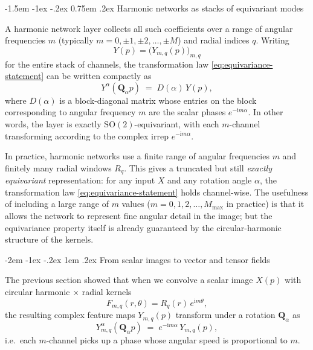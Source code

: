 \documentclass[12pt]{article}
\makeatletter
\renewcommand\section{\@startsection {section}{1}{\z@}%
                                   {-2em \@plus -1ex \@minus -.2ex}%
                                   {1em \@plus.2ex}%
                                   {\normalfont\Large\bfseries}}
\renewcommand\subsection{\@startsection{subsection}{2}{\z@}%
                                     {-1.5em \@plus -1ex \@minus -.2ex}%
                                     {0.75em \@plus .2ex}%
                                     {\normalfont\large\bfseries}}
\makeatother
\begin{document}
\subsection{Harmonic networks as stacks of equivariant modes}

A harmonic network layer collects all such coefficients over a range
of angular frequencies $m$ (typically $m=0,\pm1,\pm2,\dots,\pm M$)
and radial indices $q$. Writing
\[
  Y(p) =
  \bigl(Y_{m,q}(p)\bigr)_{m,q}
\]
for the entire stack of channels, the transformation law
\eqref{eq:equivariance-statement} can be written compactly as
\begin{equation}
  \label{eq:equivariance-matrix-form}
  Y^\alpha(\mathbf{Q}_\alpha p)
  \;=\;
  D(\alpha)\,Y(p),
\end{equation}
where $D(\alpha)$ is a block-diagonal matrix whose entries on the
block corresponding to angular frequency $m$ are the scalar phases
$e^{-\mathrm{i}m\alpha}$. In other words, the layer is exactly
$\mathrm{SO}(2)$-equivariant, with each $m$-channel transforming
according to the complex irrep $e^{-\mathrm{i}m\alpha}$.

In practice, harmonic networks use a finite range of angular
frequencies $m$ and finitely many radial windows $R_q$. This gives a
truncated but still \emph{exactly equivariant} representation: for
any input $X$ and any rotation angle $\alpha$, the transformation law
\eqref{eq:equivariance-statement} holds channel-wise. The usefulness
of including a large range of $m$ values
($m = 0,1,2,\dots,M_{\max}$ in practice) is that it allows the network
to represent fine angular detail in the image; but the equivariance
property itself is already guaranteed by the circular-harmonic
structure of the kernels.






\section{From scalar images to vector and tensor fields}
\label{sec:vectors-tensors-small-m}

The previous section showed that when we convolve a scalar image
$X(p)$ with circular harmonic $\times$ radial kernels
\[
  F_{m,q}(r,\theta) = R_q(r)\,e^{\mathrm{i}m\theta},
\]
the resulting complex feature maps $Y_{m,q}(p)$ transform under a
rotation $\mathbf{Q}_\alpha$ as
\begin{equation}
  \label{eq:scalar-m-equivariance}
  Y^{\alpha}_{m,q}(\mathbf{Q}_\alpha p)
  \;=\;
  e^{-\mathrm{i}m\alpha}\,Y_{m,q}(p),
\end{equation}
i.e.\ each $m$-channel picks up a phase whose angular speed is
proportional to $m$.
\end{document}
